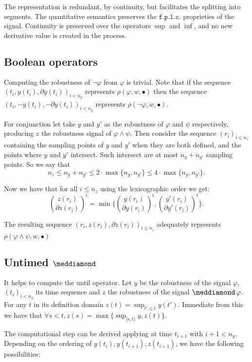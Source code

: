 \documentclass{suftesi}
\begin{document}
The representation is redundant, by continuity, but facilitates the splitting into segments. The quantitative semantics preserves the $\mathtt{f.p.l.c.}$ proprieties of the signal. Continuity is preserved over the operators $\sup$ and $\inf$, and no new derivative value is created in the process.

\subsection{Boolean operators}

Computing the robustness of $\lnot \varphi$ from $\varphi$ is trivial. Note that if the sequence $(t_i,y(t_i),\partial y(t_i))_{i<n_y}$ represents $\rho(\varphi,w,\bullet)$ then the sequence $(t_i,-y(t_i),-\partial y(t_i))_{i<n_y}$ represents $\rho(\lnot\varphi,w,\bullet)$.

For conjunction let take $y$ and $y'$ as the robustness of $\varphi$ and $\psi$ respectively, producing $z$ the robustness signal of $\varphi\land\psi$. Then consider the sequence $(r_i)_{i\leq n_z}$ containing the sampling points of $y$ and $y'$ when they are both defined, and the points where $y$ and $y'$ intersect. Such intersect are at most $n_y+n_{y'}$ sampling points. So we say that $$n_z\leq n_y+n_{y'}\leq 2\cdot \max\{n_y,n_{y'}\}\leq 4\cdot \max\{n_y,n_{y'}\}.$$

Now we have that for all $i\leq n_z$ using the lexicographic order we get: $$\binom{z(r_i)}{\partial z(r_i)}^t=\min\Biggl\{\binom{y(r_i)}{\partial y(r_i)}^t,\binom{y'(r_i)}{\partial y'(r_i)}^t\Biggr\}.$$

The resulting sequence $(r_i,z(r_i), \partial z(r_i))_{i\leq n_z}$ adequately represents $\rho(\varphi\land\psi,w,\bullet)$

\subsection{Untimed $\pos$}

It helps to compute the until operator. Let $y$ be the robustness of the signal $\varphi$, $(t_i)_{i<n_y}$ its time sequence and $z$ the robustness of the signal $\pos\varphi$. For any $t$ in its definition domain $z(t)=\sup_{t'\leq t}y(t')$. Immediate from this we have that $\forall s<t, z(s)=\max\{\sup_{[s,t)}y,z(t)\}$. 

The computational step can be derived applying at time $t_{i+1}$ with $i+1<n_y$. Depending on the ordering of ${y(t_i),y(t_{i+1}),z(t_{i+1})}$, we have the following possibilities:
\end{document}
